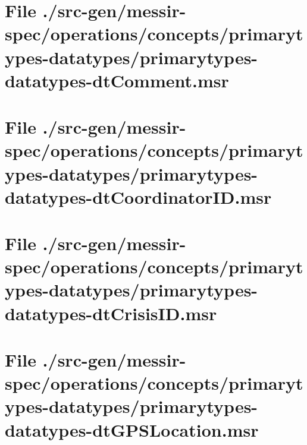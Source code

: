 \section[File /src-gen/messir-spec/operations.../primarytypes-datatypes-dtComment.msr]{File ./src-gen/messir-spec/operations/concepts/primarytypes-datatypes/primarytypes-datatypes-dtComment.msr}
\scriptsize

\normalsize
	
\section[File /src-gen/messir-spec.../primarytypes-datatypes-dtCoordinatorID.msr]{File ./src-gen/messir-spec/operations/concepts/primarytypes-datatypes/primarytypes-datatypes-dtCoordinatorID.msr}
\scriptsize

\normalsize
	
\section[File /src-gen/messir-spec/operations.../primarytypes-datatypes-dtCrisisID.msr]{File ./src-gen/messir-spec/operations/concepts/primarytypes-datatypes/primarytypes-datatypes-dtCrisisID.msr}
\scriptsize

\normalsize
	
\section[File /src-gen/messir-spec.../primarytypes-datatypes-dtGPSLocation.msr]{File ./src-gen/messir-spec/operations/concepts/primarytypes-datatypes/primarytypes-datatypes-dtGPSLocation.msr}
\scriptsize

\normalsize
	
